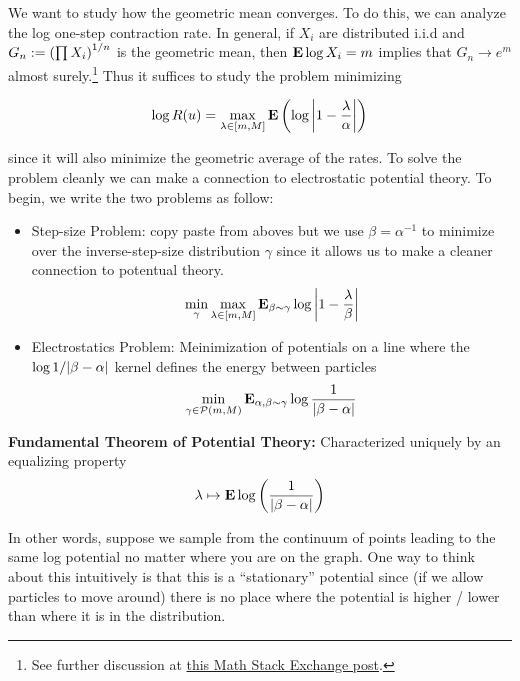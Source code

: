\documentclass[11pt]{article}
\begin{document}









We want to study how the geometric mean converges. To do this, we can analyze the log one-step contraction rate. In general, if $X_i$ are distributed i.i.d and $G_n := \left(\prod X_i\right)^{1/n}$ is the geometric mean, then $\textbf{E} \log X_i = m$ implies that $G_n \to e^m$ almost surely.\footnote{See further discussion at \href{https://math.stackexchange.com/questions/1108732/geometric-mean-with-the-law-of-large-numbers}{this Math Stack Exchange post}.} Thus it suffices to study the problem minimizing 

\[\log R(u) = \max_{\lambda\in[m, M]} \textbf{E} \left(\log{\left\vert 1-\frac{\lambda}{\alpha} \right\vert}\right)\]

since it will also minimize the geometric average of the rates. To solve the problem cleanly we can make a connection to electrostatic potential theory. To begin, we write the two problems as follow:

\begin{itemize}
\item Step-size Problem: copy paste from aboves but we use $\beta = \alpha^{-1}$ to minimize over the inverse-step-size distribution $\gamma$ since it allows us to make a cleaner connection to potentual theory.
\[\min_{\gamma} \max_{\lambda \in [m, M]}  \textbf{E}_{\beta\sim\gamma} \log {\left\vert 1-\frac{\lambda}{\beta} \right\vert}\]


\item Electrostatics Problem: Meinimization of potentials on a line where the $\log1/{\left\vert \beta-\alpha \right\vert}$ kernel defines the energy between particles \[\min_{\gamma \in \mathcal{P}(m, M)} \textbf{E}_{\alpha, \beta \sim \gamma} \log\frac{1}{{\left\vert \beta-\alpha \right\vert}} \]

\end{itemize}

\textbf{Fundamental Theorem of Potential Theory:} Characterized uniquely by an equalizing property \[\lambda \mapsto \textbf{E} \log \left(\frac{1}{{\left\vert \beta-\alpha \right\vert}}\right)\]

In other words, suppose we sample from the continuum of points leading to the same log potential no matter where you are on the graph. One way to think about this intuitively is that this is a ``stationary'' potential since (if we allow particles to move around) there is no place where the potential is higher / lower than where it is in the distribution.
\end{document}

